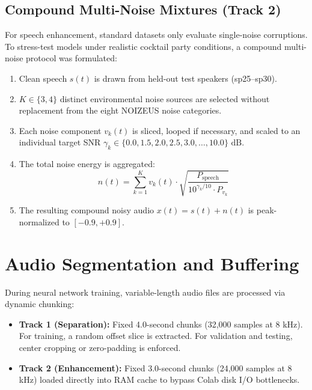 \documentclass[11pt,a4paper]{report}
\begin{document}
\subsection{Compound Multi-Noise Mixtures (Track 2)}
For speech enhancement, standard datasets only evaluate single-noise corruptions. To stress-test models under realistic cocktail party conditions, a compound multi-noise protocol was formulated:
\begin{enumerate}
    \item Clean speech $s(t)$ is drawn from held-out test speakers (sp25--sp30).
    \item $K \in \{3, 4\}$ distinct environmental noise sources are selected without replacement from the eight NOIZEUS noise categories.
    \item Each noise component $v_k(t)$ is sliced, looped if necessary, and scaled to an individual target SNR $\gamma_k \in \{0.0, 1.5, 2.0, 2.5, 3.0, \dots, 10.0\}\text{ dB}$.
    \item The total noise energy is aggregated:
    \begin{equation}
        n(t) = \sum_{k=1}^K v_k(t) \cdot \sqrt{\frac{P_{\text{speech}}}{10^{\gamma_k / 10} \cdot P_{v_k}}}
    \end{equation}
    \item The resulting compound noisy audio $x(t) = s(t) + n(t)$ is peak-normalized to $[-0.9, +0.9]$.
\end{enumerate}

\section{Audio Segmentation and Buffering}
During neural network training, variable-length audio files are processed via dynamic chunking:
\begin{itemize}
    \item \textbf{Track 1 (Separation):} Fixed 4.0-second chunks (32,000 samples at 8 kHz). For training, a random offset slice is extracted. For validation and testing, center cropping or zero-padding is enforced.
    \item \textbf{Track 2 (Enhancement):} Fixed 3.0-second chunks (24,000 samples at 8 kHz) loaded directly into RAM cache to bypass Colab disk I/O bottlenecks.
\end{itemize}

\end{document}
